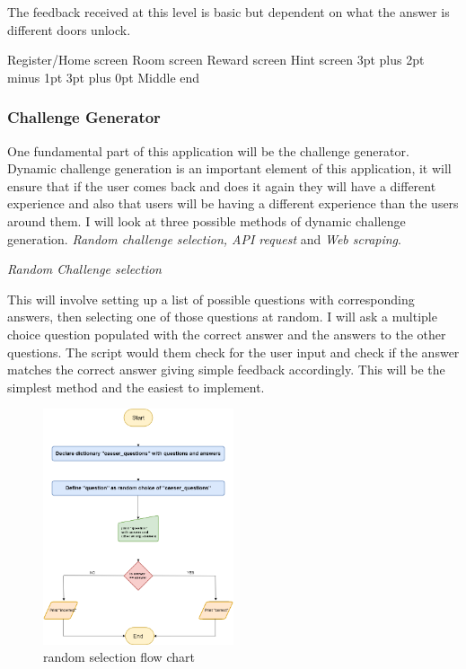 \documentclass[12pt,a4paper]{article}
\makeatletter
\renewcommand\subsection{\@startsection {subsection}{1}{2mm} %
                               {3pt plus 2pt minus 1pt} %
                               {3pt plus 0pt} %
                               {\normalfont\bfseries}}
\makeatother
\begin{document}
The feedback received at this level is basic but dependent on what the answer is different doors unlock.

{Register/Home screen} 
{Room screen} 
{Reward screen} 
{Hint screen}
\subsection{Middle end}  
\subsubsection{Challenge Generator}  
One fundamental part of this application will be the challenge generator. Dynamic challenge generation is an important element of this application, it will ensure that if the user comes back and does it again they will have a different experience and also that users will be having a different experience than the users around them. I will look at three possible methods of dynamic challenge generation. \emph{Random challenge selection, API request} and \emph{Web scraping}.  

\emph{Random Challenge selection} 

This will involve setting up a list of possible questions with corresponding answers, then selecting one of those questions at random. I will ask a multiple choice question populated with the correct answer and the answers to the other questions. The script would them check for the user input and check if the answer matches the correct answer giving simple feedback accordingly. This will be the simplest method and the easiest to implement.  

\begin{figure}[h]
    \centering
    \includegraphics[width=0.5\textwidth]{random_selection (1).png}
    \caption{random selection flow chart}
\end{figure}   
\end{document}
